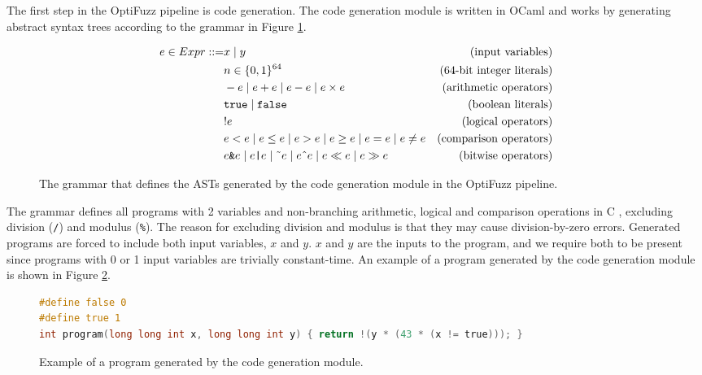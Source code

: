 The first step in the OptiFuzz pipeline is code generation. 
The code generation module is written in OCaml and works by generating abstract syntax trees according to the grammar in Figure \ref{fig:grammar}.

\begin{figure}[H]
  \centering
  \begin{align*}
    e \in Expr ::= & x \mid y &\text{(input variables)}\\
    & n \in \{0, 1\}^{64} &\text{(64-bit integer literals)}\\
    & -e \mid e + e \mid e - e \mid e \times e &\text{(arithmetic operators)}\\
    & \texttt{true} \mid \texttt{false} &\text{(boolean literals)}\\
    & !e &\text{(logical operators)}\\
    & e < e \mid e \leq e \mid e > e \mid e \geq e \mid e = e \mid e \neq e &\text{(comparison operators)}\\
    & e \texttt{\&} e \mid e \texttt{|} e \mid \text{\~{}} e \mid e \text{\^{}} e \mid e \ll e \mid e \gg e &\text{(bitwise operators)}
  \end{align*}
  \caption{The grammar that defines the ASTs generated by the code generation module in the OptiFuzz pipeline.}
  \label{fig:grammar}
\end{figure}

The grammar defines all programs with 2 variables and non-branching arithmetic, logical and comparison operations in C \citep{c-standard}, excluding division (\texttt{/}) and modulus (\texttt{\%}).
The reason for excluding division and modulus is that they may cause division-by-zero errors.
Generated programs are forced to include both input variables, $x$ and $y$.
$x$ and $y$ are the inputs to the program, and we require both to be present since programs with 0 or 1 input variables are trivially constant-time.
An example of a program generated by the code generation module is shown in Figure \ref{fig:code-gen-example}.

\begin{figure}[H]
  \begin{lstlisting}[style=defstyle,language=C, xleftmargin=2.7cm, xrightmargin=2.7cm]
#define false 0
#define true 1
int program(long long int x, long long int y) { return !(y * (43 * (x != true))); } \end{lstlisting}
  \caption{Example of a program generated by the code generation module.}
  \label{fig:code-gen-example}
\end{figure}


